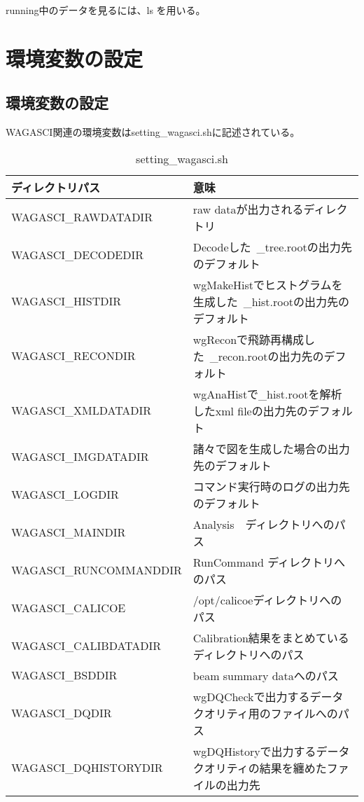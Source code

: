 \begin{enumerate}
running中のデータを見るには、ls を用いる。

\end{enumerate}

\newpage
\section{環境変数の設定}

\subsection{環境変数の設定}
WAGASCI関連の環境変数はsetting\_wagasci.shに記述されている。

\begin{table}[H]
\begin{center}
\caption{setting\_wagasci.sh}
\begin{tabular}{ll} \hline
ディレクトリパス & 意味  \\ \hline
WAGASCI\_RAWDATADIR & raw dataが出力されるディレクトリ\\
WAGASCI\_DECODEDIR   & Decodeした~\_tree.rootの出力先のデフォルト\\
WAGASCI\_HISTDIR         & wgMakeHistでヒストグラムを生成した~\_hist.rootの出力先のデフォルト\\
WAGASCI\_RECONDIR     & wgReconで飛跡再構成した~\_recon.rootの出力先のデフォルト\\
WAGASCI\_XMLDATADIR & wgAnaHistで\_hist.rootを解析したxml fileの出力先のデフォルト\\
WAGASCI\_IMGDATADIR  & 諸々で図を生成した場合の出力先のデフォルト\\
WAGASCI\_LOGDIR         & コマンド実行時のログの出力先のデフォルト\\
WAGASCI\_MAINDIR       & Analysis　ディレクトリへのパス\\
WAGASCI\_RUNCOMMANDDIR  & RunCommand ディレクトリへのパス\\
WAGASCI\_CALICOE       & /opt/calicoeディレクトリへのパス\\
WAGASCI\_CALIBDATADIR & Calibration結果をまとめているディレクトリへのパス\\
WAGASCI\_BSDDIR         & beam summary dataへのパス\\
WAGASCI\_DQDIR           & wgDQCheckで出力するデータクオリティ用のファイルへのパス\\
WAGASCI\_DQHISTORYDIR  & wgDQHistoryで出力するデータクオリティの結果を纏めたファイルの出力先 \\ \hline
\end{tabular}
\end{center}
\end{table}

